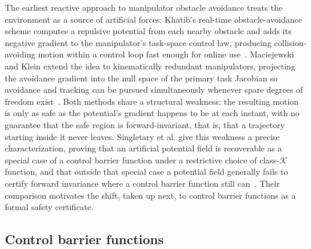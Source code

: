 The earliest reactive approach to manipulator obstacle avoidance treats the environment as a source of artificial forces: Khatib's real-time obstacle-avoidance scheme computes a repulsive potential from each nearby obstacle and adds its negative gradient to the manipulator's task-space control law, producing collision-avoiding motion within a control loop fast enough for online use~\cite{khatib1986}. Maciejewski and Klein extend the idea to kinematically redundant manipulators, projecting the avoidance gradient into the null space of the primary task Jacobian so avoidance and tracking can be pursued simultaneously whenever spare degrees of freedom exist~\cite{maciejewski1985obstacle}. Both methods share a structural weakness: the resulting motion is only as safe as the potential's gradient happens to be at each instant, with no guarantee that the safe region is forward-invariant, that is, that a trajectory starting inside it never leaves. Singletary et al. give this weakness a precise characterization, proving that an artificial potential field is recoverable as a special case of a control barrier function under a restrictive choice of class-$\mathcal{K}$ function, and that outside that special case a potential field generally fails to certify forward invariance where a control barrier function still can~\cite{singletary2021comparative}. Their comparison motivates the shift, taken up next, to control barrier functions as a formal safety certificate.

\subsection{Control barrier functions}
\label{sec:sota-cbf}

